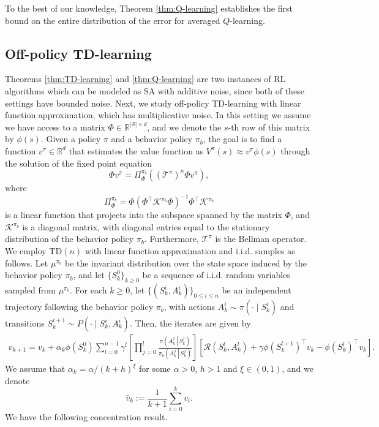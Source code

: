 \documentclass[letterpaper, 10 pt]{article}
\begin{document}
To the best of our knowledge, Theorem \ref{thm:Q-learning} establishes the first bound on the entire distribution of the error for averaged $Q$-learning.

\subsection{Off-policy TD-learning}
Theorems \ref{thm:TD-learning} and \ref{thm:Q-learning} are two instances of RL algorithms which can be modeled as SA with additive noise, since both of these settings have bounded noise. Next, we study off-policy TD-learning with linear function approximation, which has multiplicative noise. In this setting we assume we have access to a matrix $\Phi\in \mathbb{R}^{|\mathcal{S}|\times d}$, and we denote the $s$-th row of this matrix by $\phi(s)$. Given a policy $\pi$ and a behavior policy $\pi_b$, the goal is to find a function $v^\pi\in\mathbb{R}^{d}$ that estimates the value function as $V^{\pi}(s)\approx v^\pi\phi(s)$ through the solution of the fixed point equation
\[ \Phi v^\pi = \Pi_\Phi^{\pi_b}\left(\left(\mathcal{T}^\pi\right)^n \Phi v^\pi\right), \]
where
\[ \Pi_\Phi^{\pi_b}=\Phi \left(\Phi^\top\mathcal{K}^{\pi_b}\Phi\right)^{-1}\Phi^\top \mathcal{K}^{\pi_b} \]
is a linear function that projects into the subspace spanned by the matrix $\Phi$, and $\mathcal{K}^{\pi_b}$ is a diagonal matrix, with diagonal entries equal to the stationary distribution of the behavior policy $\pi_b$. Furthermore, $\mathcal{T}^\pi$ is the Bellman operator. We employ TD$(n)$ with linear function approximation and i.i.d. samples as follows. Let $\mu^{\pi_b}$ be the invariant distribution over the state space induced by the behavior policy $\pi_b$, and let $\{S_k^0\}_{k\geq 0}$ be a sequence of i.i.d. random variables sampled from $\mu^{\pi_b}$. For each $k\geq 0$, let $\{(S_k^i,A_k^i)\}_{0\leq i\leq n}$ be an independent trajectory following the behavior policy $\pi_b$, with actions $A_k^{i} \sim\pi(\cdot\mid S_k^i)$ and transitions $S_{k}^{i+1} \sim P(\cdot\mid S_k^i,A_k^i)$. Then, the iterates are given by
\begin{align*}
    v_{k+1}=v_k+\alpha_k \phi\left(S_k^0\right) \sum_{l=0}^{n-1} \gamma^{l}\left[ \prod_{j=0}^{l} \frac{\pi\left(\left.A_k^j \,\right|\, S_k^j\right)}{\pi_b\left(\left.A_k^j\,\right|\, S_k^j\right)} \right] \left[\mathcal{R}\left(S_k^l,A_k^l\right) + \gamma  \phi\left(S_k^{l+1}\right)^\top v_k-\phi\left(S_k^l\right)^\top v_k\right].
\end{align*}
We assume that $\alpha_k=\alpha/(k+h)^\xi$ for some $\alpha>0$, $h>1$ and $\xi\in(0,1)$, and we denote
\[ \bar{v}_k := \frac{1}{k+1}\sum_{i=0}^k v_i. \]
We have the following concentration result.
\end{document}

